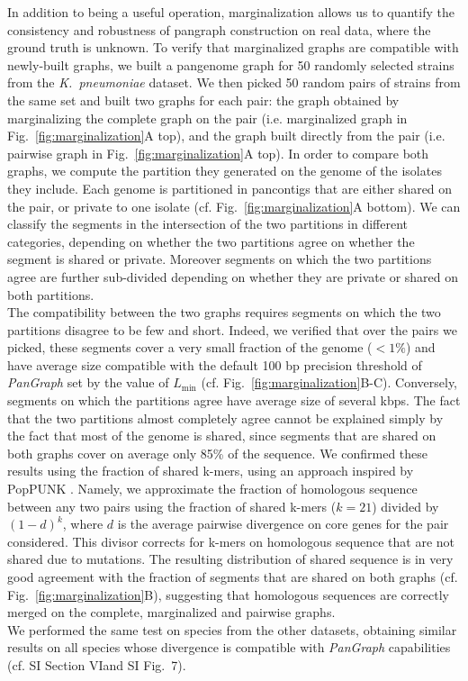 \documentclass[aps,rmp,preprint,superscriptaddress,10pt,linenumbers]{revtex4-1}
\newcommand{\Lthr}{L_{\min}}
\newcommand{\SImarginalize}{VI}
\newcommand{\SIfigMarg}{7}
\begin{document}
In addition to being a useful operation, marginalization allows us to quantify the consistency and robustness of pangraph construction on real data, where the ground truth is unknown.
To verify that marginalized graphs are compatible with newly-built graphs, we built a pangenome graph for 50 randomly selected strains from the \textit{K.~pneumoniae} dataset. We then picked 50 random pairs of strains from the same set and built two graphs for each pair: the graph obtained by marginalizing the complete graph on the pair (i.e. marginalized graph in Fig.~\ref{fig:marginalization}A top), and the graph built directly from the pair (i.e. pairwise graph in Fig.~\ref{fig:marginalization}A top).
In order to compare both graphs, we compute the partition they generated on the genome of the isolates they include. Each genome is partitioned in pancontigs that are either shared on the pair, or private to one isolate (cf. Fig.~\ref{fig:marginalization}A bottom). We can classify the segments in the intersection of the two partitions in different categories, depending on whether the two partitions agree on whether the segment is shared or private. Moreover segments on which the two partitions agree are further sub-divided depending on whether they are private or shared on both partitions.\\
The compatibility between the two graphs requires segments on which the two partitions disagree to be few and short. Indeed, we verified that over the pairs we picked, these segments cover a very small fraction of the genome ($<1\%$) and have average size compatible with the default 100 bp precision threshold of \textit{PanGraph} set by the value of $\Lthr$ (cf. Fig.~\ref{fig:marginalization}B-C). Conversely, segments on which the partitions agree have average size of several kbps. The fact that the two partitions almost completely agree cannot be explained simply by the fact that most of the genome is shared, since segments that are shared on both graphs cover on average only 85\% of the sequence. We confirmed these results using the fraction of shared k-mers, using an approach inspired by PopPUNK \cite{lees2019fast}. Namely, we approximate the fraction of homologous sequence between any two pairs using the fraction of shared k-mers ($k=21$) divided by $(1-d)^{k}$, where $d$ is the average pairwise divergence on core genes for the pair considered. This divisor corrects for k-mers on homologous sequence that are not shared due to mutations. The resulting distribution of shared sequence is in very good agreement with the fraction of segments that are shared on both graphs (cf. Fig.~\ref{fig:marginalization}B), suggesting that homologous sequences are correctly merged on the complete, marginalized and pairwise graphs.\\
We performed the same test on species from the other datasets, obtaining similar results on all species whose divergence is compatible with \textit{PanGraph} capabilities (cf. SI Section \SImarginalize and SI Fig.~\SIfigMarg).
\end{document}
